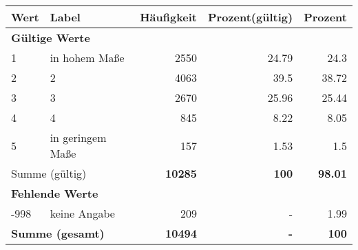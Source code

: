      \begin{longtable}{lXrrr}
     \toprule
     \textbf{Wert} & \textbf{Label} & \textbf{Häufigkeit} & \textbf{Prozent(gültig)} & \textbf{Prozent} \\
     \endhead
     \midrule
     \multicolumn{5}{l}{\textbf{Gültige Werte}}\\

     1 &
     \multicolumn{1}{X}{ in hohem Maße   } &


       \num{2550} &
       \num[round-mode=places,round-precision=2]{24.79} &
         \num[round-mode=places,round-precision=2]{24.3} \\

     2 &
     \multicolumn{1}{X}{ 2   } &


       \num{4063} &
       \num[round-mode=places,round-precision=2]{39.5} &
         \num[round-mode=places,round-precision=2]{38.72} \\

     3 &
     \multicolumn{1}{X}{ 3   } &


       \num{2670} &
       \num[round-mode=places,round-precision=2]{25.96} &
         \num[round-mode=places,round-precision=2]{25.44} \\

     4 &
     \multicolumn{1}{X}{ 4   } &


       \num{845} &
       \num[round-mode=places,round-precision=2]{8.22} &
         \num[round-mode=places,round-precision=2]{8.05} \\

     5 &
     \multicolumn{1}{X}{ in geringem Maße   } &


       \num{157} &
       \num[round-mode=places,round-precision=2]{1.53} &
         \num[round-mode=places,round-precision=2]{1.5} \\
     \midrule
     \multicolumn{2}{l}{Summe (gültig)} &
       \textbf{\num{10285}} &
     \textbf{\num{100}} &
       \textbf{\num[round-mode=places,round-precision=2]{98.01}} \\
     \multicolumn{5}{l}{\textbf{Fehlende Werte}}\\
       -998 &
       keine Angabe &
         \num{209} &
        - &
         \num[round-mode=places,round-precision=2]{1.99} \\
     \midrule
     \multicolumn{2}{l}{\textbf{Summe (gesamt)}} &
          \textbf{\num{10494}} &
        \textbf{-} &
        \textbf{\num{100}} \\
     \bottomrule
     \end{longtable}
     

